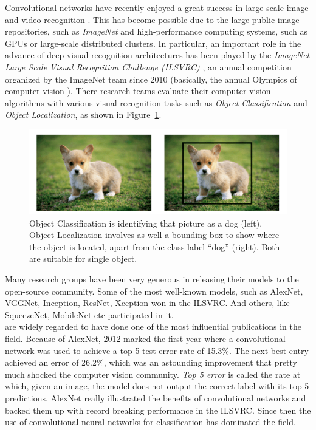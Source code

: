 \documentclass[12pt,a4paper,table,dvipsnames,tikz]{report}
\newcommand{\alleg}{\enquote}
\newcommand{\term}{\textit}
\newcommand{\acronym}{\MakeUppercase}
\newcommand{\bl}[1]{{\hypersetup{linkcolor=blue}#1}}
\begin{document}
	Convolutional networks have recently enjoyed a great success in large-scale image 
	and video recognition \citep{Simonyan_vgg}. This has become possible due to the large 
	public image repositories, such as \term{ImageNet} \citep{Deng} and high-performance 
	computing systems, such as \acronym{gpu}s or large-scale distributed clusters. In 
	particular, an important role in the advance of deep visual recognition architectures 
	has been played by the \term{ImageNet Large Scale Visual Recognition Challenge 
	(\acronym{ilsvrc})} \citep{Russakovsky}, an annual competition organized by the 
	ImageNet team since 2010 (basically, the annual Olympics of computer vision \citep{Deshpande}). 
	There research teams evaluate their computer vision algorithms with various visual 
	recognition tasks such as \term{Object Classification} and \term{Object Localization}, 
	as shown in Figure~\bl{\ref{fig:clas}}.
	\\
	
	\begin{figure}[h!]
		\centering
		\includegraphics[width=\textwidth]{clas_loc}
		\caption{Object Classification is identifying that picture as a dog (left). Object 
			Localization involves as well a bounding box to show where the object is located, 
			apart from the class label \alleg{dog} (right). Both are suitable for single object.}
		\label{fig:clas}
	\end{figure}
	
	Many research groups have been very generous in releasing their 
	models to the open-source community. Some of the most well-known models, such as 
	AlexNet, VGGNet, Inception, ResNet, Xception \citep{Krizhevsky_alexnet, Simonyan_vgg, 
	Szegedy_inception, He_resnet, Chollet_xception} won in the \acronym{ilsvrc}. 
	And others, like SqueezeNet, MobileNet \citep{Iandola_squeezenet, Howard_mobilenet} 
	etc participated in it.
	\\
	
	\citet{Krizhevsky_alexnet} 
	are widely regarded to have done one of the most influential publications in the field. 
	Because of AlexNet, 2012 marked the first year where a convolutional network was used to 
	achieve a top 5 test error rate of 15.3\%. The next best entry achieved an error 
	of 26.2\%, which was an astounding improvement that pretty much shocked the computer 
	vision community. \term{Top 5 error} is called the rate at which, given an image, 
	the model does not output the correct label with its top 5 predictions. AlexNet 
	really illustrated the benefits of convolutional networks and backed them up with 
	record breaking performance in the \acronym{ilsvrc}. Since then the use of convolutional 
	neural networks for classification has dominated the field.
	\\
	
\end{document}
